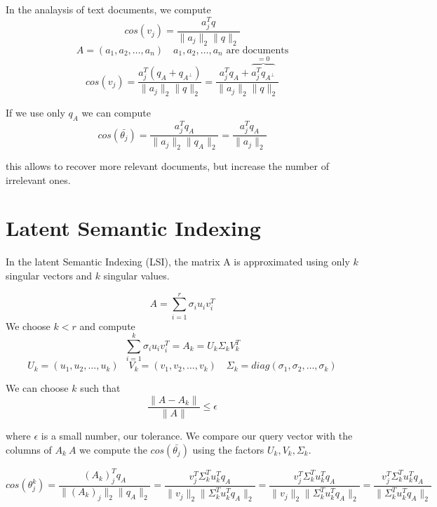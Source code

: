 In the analaysis of text documents, we compute
$$ cos(v_j) = \frac{a_j^Tq}{\|a_j\|_2 \|q\|_2} $$
$$ A = (a_1, a_2, \ldots, a_n) \quad a_1, a_2, \ldots, a_n \text{ are documents} $$
$$ cos(v_j) = \frac{a_j^T(q_A + q_{A^{\perp}})}{\|a_j\|_2 \|q\|_2} = 
\frac{a_j^Tq_A + \overbrace{a_j^Tq_{A^{\perp}}}^{=0}}{\|a_j\|_2 \|q\|_2}
$$

If we use only $q_A$ we can compute
$$ cos(\bar{\theta_j}) = \frac{a_j^Tq_A}{\|a_j\|_2 \|q_A\|_2} = \frac{a_j^Tq_A}{\|a_j\|_2}$$

this allows to recover more relevant documents, but increase the number of irrelevant ones.

\section{Latent Semantic Indexing}
In the latent Semantic Indexing (LSI), the matrix A is approximated using only $k$ singular vectors and
$k$ singular values.

$$ A = \sum_{i=1}^r \sigma_i u_i v_i^T $$
We choose $k < r$ and compute
$$\sum_{i=1}^k \sigma_i u_i v_i^T = A_k = U_k\Sigma_kV_k^T$$
$$U_k = (u_1, u_2, \ldots, u_k) \quad V_k = (v_1, v_2, \ldots, v_k) \quad \Sigma_k = diag(\sigma_1, \sigma_2, \ldots, \sigma_k)$$

We can choose $k$ such that
$$ \frac{\|A - A_k\|}{\|A\|} \leq \epsilon $$

where $\epsilon$ is a small number, our tolerance.
We compare our query vector with the columns of $A_k ~ A$ we compute the $cos(\bar{\theta_j})$ using the factors $U_k, V_k, \Sigma_k$.

$$
cos(\theta^k_j) = \frac{(A_k)_j^Tq_A}{\|(A_k)_j\|_2 \|q_A\|_2}
= \frac{v_j^T\Sigma_k^Tu_k^Tq_A}{\|v_j\|_2 \|\Sigma_k^Tu_k^Tq_A\|_2}
= \frac{v_j^T\Sigma_k^Tu_k^Tq_A}{\|v_j\|_2 \|\Sigma_k^Tu_k^Tq_A\|_2}
= \frac{v_j^T\Sigma_k^Tu_k^Tq_A}{\|\Sigma_k^Tu_k^Tq_A\|_2}$$